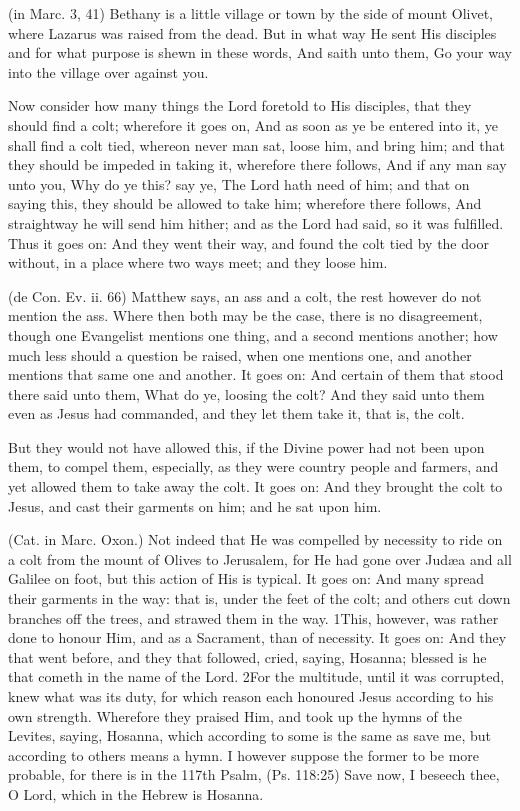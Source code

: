  (in Marc. 3, 41) Bethany is a little village or town by the side of mount Olivet, where Lazarus was raised from the dead. But in what way He sent His disciples and for what purpose is shewn in these words, And saith unto them, Go your way into the village over against you.

 Now consider how many things the Lord foretold to His disciples, that they should find a colt; wherefore it goes on, And as soon as ye be entered into it, ye shall find a colt tied, whereon never man sat, loose him, and bring him; and that they should be impeded in taking it, wherefore there follows, And if any man say unto you, Why do ye this? say ye, The Lord hath need of him; and that on saying this, they should be allowed to take him; wherefore there follows, And straightway he will send him hither; and as the Lord had said, so it was fulfilled. Thus it goes on: And they went their way, and found the colt tied by the door without, in a place where two ways meet; and they loose him.

 (de Con. Ev. ii. 66) Matthew says, an ass and a colt, the rest however do not mention the ass. Where then both may be the case, there is no disagreement, though one Evangelist mentions one thing, and a second mentions another; how much less should a question be raised, when one mentions one, and another mentions that same one and another. It goes on: And certain of them that stood there said unto them, What do ye, loosing the colt? And they said unto them even as Jesus had commanded, and they let them take it, that is, the colt.

 But they would not have allowed this, if the Divine power had not been upon them, to compel them, especially, as they were country people and farmers, and yet allowed them to take away the colt. It goes on: And they brought the colt to Jesus, and cast their garments on him; and he sat upon him.

 (Cat. in Marc. Oxon.) Not indeed that He was compelled by necessity to ride on a colt from the mount of Olives to Jerusalem, for He had gone over Judæa and all Galilee on foot, but this action of His is typical. It goes on: And many spread their garments in the way: that is, under the feet of the colt; and others cut down branches off the trees, and strawed them in the way. 1This, however, was rather done to honour Him, and as a Sacrament, than of necessity. It goes on: And they that went before, and they that followed, cried, saying, Hosanna; blessed is he that cometh in the name of the Lord. 2For the multitude, until it was corrupted, knew what was its duty, for which reason each honoured Jesus according to his own strength. Wherefore they praised Him, and took up the hymns of the Levites, saying, Hosanna, which according to some is the same as save me, but according to others means a hymn. I however suppose the former to be more probable, for there is in the 117th Psalm, (Ps. 118:25) Save now, I beseech thee, O Lord, which in the Hebrew is Hosanna.

